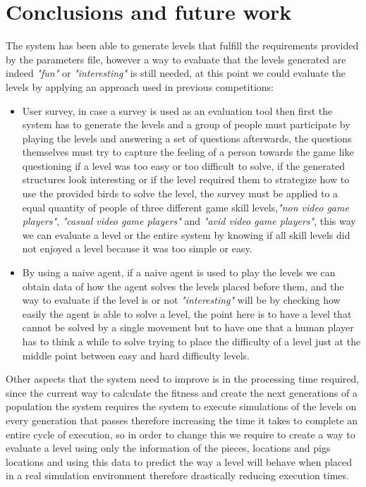 \documentclass[conference]{IEEEtran}
\begin{document}
    \section{Conclusions and future work}
    \label{conclusion}
    
     The system has been able to generate levels that fulfill the requirements
     provided by the parameters file, however a way to evaluate that the levels
     generated are indeed \textit{"fun"} or \textit{"interesting"} is still
     needed, at this point we could evaluate the levels by applying an approach
     used in previous competitions:
     \begin{itemize}
        \item User survey, in case a survey is used as an evaluation tool then first
        the system has to generate the levels and a group of people must participate
        by playing the levels and answering a set of questions afterwards, the
        questions themselves must try to capture the feeling of a person towards the
        game like questioning if a level was too easy or too difficult to solve, if
        the generated structures look interesting or if the level required them to
        strategize how to use the provided birds to solve the level, the survey must
        be applied to a equal quantity of people of three different game skill
        levels,\textit{"non video game players"}, \textit{"casual video game
        players"} and \textit{"avid video game players"}, this way we can evaluate a
        level or the entire system by knowing if all skill levels did not enjoyed a
        level because it was too simple or easy.
        \item By using a naive agent, if a naive agent is used to play the levels we
        can obtain data of how the agent solves the levels placed before them, and
        the way to evaluate if the level is or not \textit{"interesting"} will be by
        checking how easily the agent is able to solve a level, the point here is
        to have a level that cannot be solved by a single movement but to have one
        that a human player has to think a while to solve trying to place the
        difficulty of a level just at the middle point between easy and hard
        difficulty levels.
    \end{itemize}
        
    Other aspects that the system need to improve is in the processing time
    required, since the current way to calculate the fitness and create the next
    generations of a population the system requires the system to execute
    simulations of the levels on every generation that passes therefore increasing
    the time it takes to complete an entire cycle of execution, so in order to
    change this we require to create a way to evaluate a level using only the
    information of the pieces, locations and pigs locations and using this data to
    predict the way a level will behave when placed in a real simulation environment
    therefore drastically reducing execution times.
\end{document}
